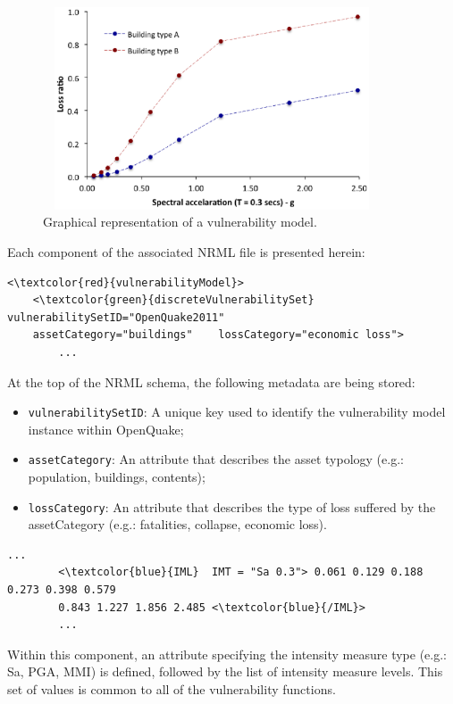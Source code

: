 \begin{figure}[ht]
\centering
\includegraphics[width=10cm,height=6cm]{./figures/vulnerabilityModel.eps}
\caption{Graphical representation of a vulnerability model.}
\label{fig:vulModel}
\end{figure}

Each component of the associated NRML file is presented herein:

\begin{Verbatim}[frame=single, commandchars=\\\{\}, samepage=true]
<\textcolor{red}{vulnerabilityModel}>
    <\textcolor{green}{discreteVulnerabilitySet} vulnerabilitySetID="OpenQuake2011"	
    assetCategory="buildings"    lossCategory="economic loss">
        ...
\end{Verbatim}

At the top of the NRML schema, the following metadata are being stored:
\begin{itemize}
\item  \Verb+vulnerabilitySetID+: A unique key used to identify the vulnerability model instance within OpenQuake;
\item  \Verb+assetCategory+: An attribute that describes the asset typology (e.g.: population, buildings, contents);
\item  \Verb+lossCategory+: An attribute that describes the type of loss suffered by the assetCategory (e.g.: fatalities, collapse, economic loss). 
\end{itemize}

\begin{Verbatim}[frame=single, commandchars=\\\{\}, samepage=true]
    ...
        <\textcolor{blue}{IML}  IMT = "Sa 0.3"> 0.061 0.129 0.188 0.273 0.398 0.579 
        0.843 1.227 1.856 2.485 <\textcolor{blue}{/IML}>
        ...
\end{Verbatim}

Within this component, an attribute specifying the intensity measure type (e.g.: Sa, PGA, MMI) is defined, followed by the list of intensity measure levels. This set of values is common to all of the vulnerability functions.

